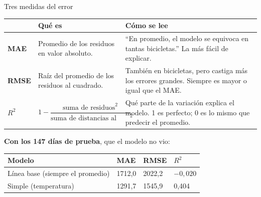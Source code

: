 \documentclass[aspectratio=169,11pt]{beamer}
\begin{document}
\begin{frame}[t]{Tres medidas del error}
  \footnotesize
  \renewcommand{\arraystretch}{1.25}
  \begin{tabular}{@{}L{1.3cm}L{5.3cm}L{6.5cm}@{}}
    \toprule
    & \textbf{Qué es} & \textbf{Cómo se lee} \\
    \midrule
    \textbf{MAE} & Promedio de los residuos en valor absoluto. & ``En promedio, el modelo se equivoca en tantas bicicletas.'' La más fácil de explicar. \\
    \textbf{RMSE} & Raíz del promedio de los residuos al cuadrado. & También en bicicletas, pero castiga más los errores grandes. Siempre es mayor o igual que el MAE. \\
    \textbf{$R^2$} & $1 - \dfrac{\text{suma de residuos}^2}{\text{suma de distancias al promedio}^2}$ & Qué parte de la variación explica el modelo. 1 es perfecto; 0 es lo mismo que predecir el promedio. \\
    \bottomrule
  \end{tabular}
  \vspace{0.15cm}

  \small\textbf{Con los 147 días de prueba}, que el modelo no vio:
  \vspace{0.05cm}

  \footnotesize
  \begin{tabular}{@{}L{5.0cm}R{1.8cm}R{1.8cm}R{1.6cm}@{}}
    \toprule
    \textbf{Modelo} & \textbf{MAE} & \textbf{RMSE} & \textbf{$R^2$} \\
    \midrule
    Línea base (siempre el promedio) & 1712,0 & 2022,2 & $-0{,}020$ \\
    Simple (temperatura) & 1291,7 & 1545,9 & 0,404 \\
    \bottomrule
  \end{tabular}
\end{frame}
\end{document}
